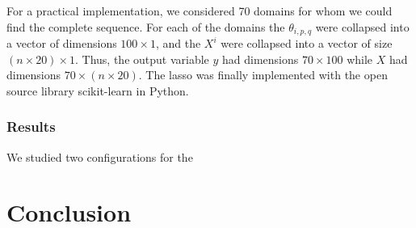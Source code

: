 \documentclass[a4paper, 12pt]{article}
\begin{document}
For a practical implementation, we considered 70 domains for whom we could find the complete sequence. For each of the domains the $\theta_{i,p,q}$ were collapsed into a vector of dimensions $100 \times 1$, and the $X^{i}$ were collapsed into a vector of size $ (n \times 20) \times 1$. Thus, the output variable $y$ had dimensions $70 \times 100$ while $X$ had dimensions $70 \times (n\times 20)$. The lasso was finally implemented with the open source library scikit-learn in Python. 

\section{Results}

We studied two configurations for the 
\part{Conclusion}
\end{document}
